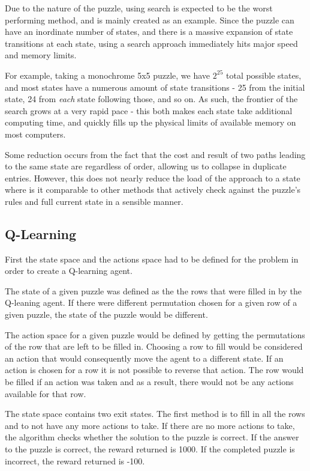 \documentclass{svproc}
\begin{document}
Due to the nature of the puzzle, using search is expected to be the worst performing method, and is mainly created as an example.
Since the puzzle can have an inordinate number of states, and there is a massive expansion of state transitions at each state, using a search approach immediately hits major speed and memory limits.

For example, taking a monochrome 5x5 puzzle, we have $2^{25}$ total possible states, and most states have a numerous amount of state transitions - 25 from the initial state, 24 from \textit{each} state following those, and so on.
As such, the frontier of the search grows at a very rapid pace - this both makes each state take additional computing time, and quickly fills up the physical limits of available memory on most computers.

Some reduction occurs from the fact that the cost and result of two paths leading to the same state are regardless of order, allowing us to collapse in duplicate entries.
However, this does not nearly reduce the load of the approach to a state where is it comparable to other methods that actively check against the puzzle's rules and full current state in a sensible manner.

\subsection{Q-Learning}
First the state space and the actions space had to be defined for the problem in order to create a Q-learning agent.

The state of a given puzzle was defined as the the rows that were filled in by the Q-leaning agent. If there were different permutation chosen for a given row of a given puzzle, the state of the puzzle would be different.

The action space for a given puzzle would be defined by getting the permutations of the row that are left to be filled in. Choosing a row to fill would be considered an action that would consequently move the agent to a different state. If an action is chosen for a row it is not possible to reverse that action. The row would be filled if an action was taken and as a result, there would not be any actions available for that row.

The state space contains two exit states. The first method is to fill in all the rows and to not have any more actions to take. If there are no more actions to take, the algorithm checks whether the solution to the puzzle is correct. If the answer to the puzzle is correct, the reward returned is 1000. If the completed puzzle is incorrect, the reward returned is -100.
\end{document}
